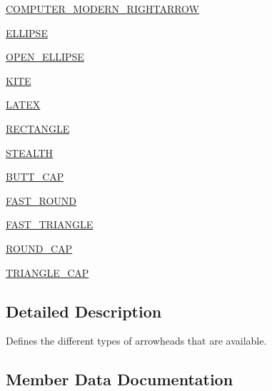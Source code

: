 \begin{DoxyCompactItemize}
\hyperlink{enumcom_1_1aarrelaakso_1_1drawl_1_1_arrowhead_1_1_type_a23ba1f0a86e5037ac9327f2743a4bede}{C\+O\+M\+P\+U\+T\+E\+R\+\_\+\+M\+O\+D\+E\+R\+N\+\_\+\+R\+I\+G\+H\+T\+A\+R\+R\+OW}
\item 
\hyperlink{enumcom_1_1aarrelaakso_1_1drawl_1_1_arrowhead_1_1_type_a7243ba4efe6f7013ec9ec3e66f581fd8}{E\+L\+L\+I\+P\+SE}
\item 
\hyperlink{enumcom_1_1aarrelaakso_1_1drawl_1_1_arrowhead_1_1_type_a2a469be7b814da9b632d56e431565b37}{O\+P\+E\+N\+\_\+\+E\+L\+L\+I\+P\+SE}
\item 
\hyperlink{enumcom_1_1aarrelaakso_1_1drawl_1_1_arrowhead_1_1_type_a3d093a6479d611b91fd4802da7d4afc3}{K\+I\+TE}
\item 
\hyperlink{enumcom_1_1aarrelaakso_1_1drawl_1_1_arrowhead_1_1_type_adca44209b56fad76f36cc6e8ad546c68}{L\+A\+T\+EX}
\item 
\hyperlink{enumcom_1_1aarrelaakso_1_1drawl_1_1_arrowhead_1_1_type_a8380490ae211a6681e81fd6835388edf}{R\+E\+C\+T\+A\+N\+G\+LE}
\item 
\hyperlink{enumcom_1_1aarrelaakso_1_1drawl_1_1_arrowhead_1_1_type_a300d91ce1b8770d4f39c39479528a9d5}{S\+T\+E\+A\+L\+TH}
\item 
\hyperlink{enumcom_1_1aarrelaakso_1_1drawl_1_1_arrowhead_1_1_type_a11a1867d678f006db71e1a288df31079}{B\+U\+T\+T\+\_\+\+C\+AP}
\item 
\hyperlink{enumcom_1_1aarrelaakso_1_1drawl_1_1_arrowhead_1_1_type_abc18d5d09da2af023716c6a170f19dd7}{F\+A\+S\+T\+\_\+\+R\+O\+U\+ND}
\item 
\hyperlink{enumcom_1_1aarrelaakso_1_1drawl_1_1_arrowhead_1_1_type_ab17746e47ec7e8ee2177e11bcee3201a}{F\+A\+S\+T\+\_\+\+T\+R\+I\+A\+N\+G\+LE}
\item 
\hyperlink{enumcom_1_1aarrelaakso_1_1drawl_1_1_arrowhead_1_1_type_ae9b576cd80e0be2d2c1655d8939b2064}{R\+O\+U\+N\+D\+\_\+\+C\+AP}
\item 
\hyperlink{enumcom_1_1aarrelaakso_1_1drawl_1_1_arrowhead_1_1_type_a2b5a534d002a522553112995369db66e}{T\+R\+I\+A\+N\+G\+L\+E\+\_\+\+C\+AP}
\end{DoxyCompactItemize}


\subsection{Detailed Description}
Defines the different types of arrowheads that are available. 

\subsection{Member Data Documentation}
\mbox{\label{enumcom_1_1aarrelaakso_1_1drawl_1_1_arrowhead_1_1_type_ab1a7fc7ccf7d089ac3b9b542d5658a7d}} 
